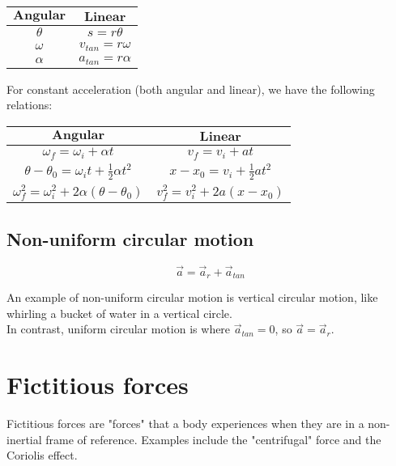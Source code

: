 \documentclass[11pt]{article}
\begin{document}
\begin{center}
\begin{tabular}{ c|c }
\(\textbf{Angular}\) & \(\textbf{Linear}\) \\
\hline
\(\theta\) & \(s = r\theta\) \\
\(\omega\) & \(v_{tan} = r\omega\) \\
\(\alpha\) & \(a_{tan} = r\alpha\) \\
\end{tabular}
\end{center}

For constant acceleration (both angular and linear), we have the following relations:
\begin{center}
\begin{tabular}{ c|c }
\(\textbf{Angular}\) & \(\textbf{Linear}\) \\
\hline
\(\omega_f = \omega_i + \alpha t\) & \(v_f = v_i + at\) \\
\(\theta - \theta_0 = \omega_i t + \frac{1}{2} \alpha t^2\) & \(x - x_0 = v_i + \frac{1}{2} a t^2\) \\
\(\omega_f^2 = \omega_i^2 + 2 \alpha(\theta - \theta_0)\) & \(v_f^2 = v_i^2 + 2a(x - x_0)\)
\end{tabular}
\end{center}

\subsection{Non-uniform circular motion}
\label{sec:org883c101}
\[\vec{a} = \vec{a}_r + \vec{a}_{tan}\]

An example of non-uniform circular motion is vertical circular motion, like whirling a bucket of water in a vertical circle.
\\[0pt]

In contrast, uniform circular motion is where \(\vec{a}_{tan} = 0\), so \(\vec{a} = \vec{a}_r\).


\section{Fictitious forces}
\label{sec:org6c62571}
Fictitious forces are "forces" that a body experiences when they are in a non-inertial frame of reference. Examples include the "centrifugal" force and the Coriolis effect.
\end{document}
